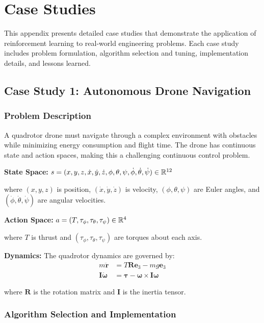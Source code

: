 \chapter{Case Studies}
\label{app:case-studies}

This appendix presents detailed case studies that demonstrate the application of reinforcement learning to real-world engineering problems. Each case study includes problem formulation, algorithm selection and tuning, implementation details, and lessons learned.

\section{Case Study 1: Autonomous Drone Navigation}

\subsection{Problem Description}

A quadrotor drone must navigate through a complex environment with obstacles while minimizing energy consumption and flight time. The drone has continuous state and action spaces, making this a challenging continuous control problem.

\textbf{State Space:} $s = (x, y, z, \dot{x}, \dot{y}, \dot{z}, \phi, \theta, \psi, \dot{\phi}, \dot{\theta}, \dot{\psi}) \in \mathbb{R}^{12}$

where $(x,y,z)$ is position, $(\dot{x}, \dot{y}, \dot{z})$ is velocity, $(\phi, \theta, \psi)$ are Euler angles, and $(\dot{\phi}, \dot{\theta}, \dot{\psi})$ are angular velocities.

\textbf{Action Space:} $a = (T, \tau_\phi, \tau_\theta, \tau_\psi) \in \mathbb{R}^4$

where $T$ is thrust and $(\tau_\phi, \tau_\theta, \tau_\psi)$ are torques about each axis.

\textbf{Dynamics:} The quadrotor dynamics are governed by:
\begin{align}
m\ddot{\mathbf{r}} &= T\mathbf{R}\mathbf{e}_3 - mg\mathbf{e}_3 \\
\mathbf{I}\dot{\boldsymbol{\omega}} &= \boldsymbol{\tau} - \boldsymbol{\omega} \times \mathbf{I}\boldsymbol{\omega}
\end{align}

where $\mathbf{R}$ is the rotation matrix and $\mathbf{I}$ is the inertia tensor.

\subsection{Algorithm Selection and Implementation}

